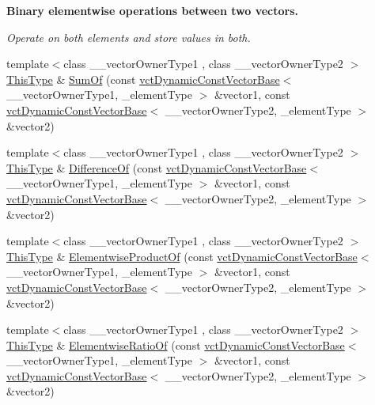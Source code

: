 \begin{Indent}{\bf Binary elementwise operations between two vectors.}\par
{\em Operate on both elements and store values in both. }\begin{DoxyCompactItemize}
\item 
{\footnotesize template$<$class \-\_\-\-\_\-vector\-Owner\-Type1 , class \-\_\-\-\_\-vector\-Owner\-Type2 $>$ }\\\hyperlink{classvct_dynamic_const_vector_base_a39da273523717f678f54d3321ebca3dd}{This\-Type} \& \hyperlink{classvct_dynamic_vector_base_a84f320f980e99e4e0ca50791e2cb1135}{Sum\-Of} (const \hyperlink{classvct_dynamic_const_vector_base}{vct\-Dynamic\-Const\-Vector\-Base}$<$ \-\_\-\-\_\-vector\-Owner\-Type1, \-\_\-element\-Type $>$ \&vector1, const \hyperlink{classvct_dynamic_const_vector_base}{vct\-Dynamic\-Const\-Vector\-Base}$<$ \-\_\-\-\_\-vector\-Owner\-Type2, \-\_\-element\-Type $>$ \&vector2)
\item 
{\footnotesize template$<$class \-\_\-\-\_\-vector\-Owner\-Type1 , class \-\_\-\-\_\-vector\-Owner\-Type2 $>$ }\\\hyperlink{classvct_dynamic_const_vector_base_a39da273523717f678f54d3321ebca3dd}{This\-Type} \& \hyperlink{classvct_dynamic_vector_base_a5aaf9ec315eff49da3966255f7378ab8}{Difference\-Of} (const \hyperlink{classvct_dynamic_const_vector_base}{vct\-Dynamic\-Const\-Vector\-Base}$<$ \-\_\-\-\_\-vector\-Owner\-Type1, \-\_\-element\-Type $>$ \&vector1, const \hyperlink{classvct_dynamic_const_vector_base}{vct\-Dynamic\-Const\-Vector\-Base}$<$ \-\_\-\-\_\-vector\-Owner\-Type2, \-\_\-element\-Type $>$ \&vector2)
\item 
{\footnotesize template$<$class \-\_\-\-\_\-vector\-Owner\-Type1 , class \-\_\-\-\_\-vector\-Owner\-Type2 $>$ }\\\hyperlink{classvct_dynamic_const_vector_base_a39da273523717f678f54d3321ebca3dd}{This\-Type} \& \hyperlink{classvct_dynamic_vector_base_afc8c54fbb85155eefbeaf1d2d31fcc84}{Elementwise\-Product\-Of} (const \hyperlink{classvct_dynamic_const_vector_base}{vct\-Dynamic\-Const\-Vector\-Base}$<$ \-\_\-\-\_\-vector\-Owner\-Type1, \-\_\-element\-Type $>$ \&vector1, const \hyperlink{classvct_dynamic_const_vector_base}{vct\-Dynamic\-Const\-Vector\-Base}$<$ \-\_\-\-\_\-vector\-Owner\-Type2, \-\_\-element\-Type $>$ \&vector2)
\item 
{\footnotesize template$<$class \-\_\-\-\_\-vector\-Owner\-Type1 , class \-\_\-\-\_\-vector\-Owner\-Type2 $>$ }\\\hyperlink{classvct_dynamic_const_vector_base_a39da273523717f678f54d3321ebca3dd}{This\-Type} \& \hyperlink{classvct_dynamic_vector_base_a39deeeee45de88cd2408d8e4de3306fb}{Elementwise\-Ratio\-Of} (const \hyperlink{classvct_dynamic_const_vector_base}{vct\-Dynamic\-Const\-Vector\-Base}$<$ \-\_\-\-\_\-vector\-Owner\-Type1, \-\_\-element\-Type $>$ \&vector1, const \hyperlink{classvct_dynamic_const_vector_base}{vct\-Dynamic\-Const\-Vector\-Base}$<$ \-\_\-\-\_\-vector\-Owner\-Type2, \-\_\-element\-Type $>$ \&vector2)

\end{DoxyCompactItemize}
\end{Indent}
